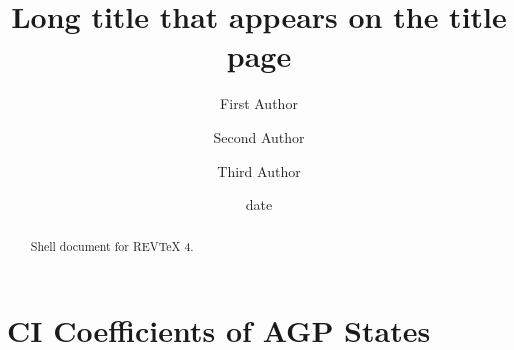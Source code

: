 \documentclass[aps,preprint]{revtex4}
\begin{document}
\title[Short title for running header]{Long title that appears on the title
page}
\author{First Author}
\author{Second Author}
\author{Third Author}

\begin{abstract}
Shell document for REV\TeX{} 4.
\end{abstract}

\date[Date text]{date}
\maketitle
\tableofcontents

\section{CI Coefficients of AGP States}
\end{document}
